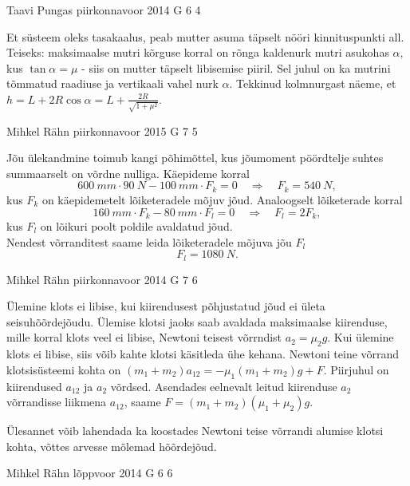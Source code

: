 \documentclass[11pt, twoside]{article}
\begin{document}
{%
{Taavi Pungas} %
{piirkonnavoor} %
{2014} %
{G 6} %
{4} %
{

\ifSolution
Et süsteem oleks tasakaalus, peab mutter asuma täpselt nööri kinnituspunkti all. Teiseks: maksimaalse mutri kõrguse korral on rõnga kaldenurk mutri asukohas $\alpha$, kus $\tan \alpha = \mu$ - siis on mutter täpselt libisemise piiril. Sel juhul on ka mutrini tõmmatud raadiuse ja vertikaali vahel nurk $\alpha$. Tekkinud kolmnurgast näeme, et $h=L+2R\cos \alpha = L+ \frac{2R}{\sqrt{1+\mu^2}}$.
\fi
}

{Mihkel Rähn} %
{piirkonnavoor} %
{2015} %
{G 7} %
{5} %
{

\ifSolution
Jõu ülekandmine toimub kangi põhimõttel, kus jõumoment pöördtelje suhtes summaarselt on võrdne nulliga. Käepideme korral
\[ \SI{600}{mm}\cdot\SI{90}{N}-\SI{100}{mm}\cdot F_k = 0 \quad\Rightarrow\quad F_k = \SI{540}{N}, \]
kus $F_k$ on käepidemetelt lõiketeradele mõjuv jõud. Analoogselt lõiketerade korral
\[ \SI{160}{mm}\cdot F_k - \SI{80}{mm}\cdot F_l = 0 \quad\Rightarrow\quad F_l = 2F_k, \]
kus $F_l$ on lõikuri poolt poldile avaldatud jõud.\\
Nendest võrranditest saame leida lõiketeradele mõjuva jõu $F_l$
\[ F_l = \SI{1080}{N}.\]
\fi
}

{Mihkel Rähn} %
{piirkonnavoor} %
{2014} %
{G 7} %
{6} %
{

\ifSolution
Ülemine klots ei libise, kui kiirendusest põhjustatud jõud ei ületa seisuhõõrdejõudu. Ülemise klotsi jaoks saab avaldada maksimaalse kiirenduse, mille korral klots veel ei libise, Newtoni teisest võrrndist $a_2=\mu_2g$. Kui ülemine klots ei libise, siis võib kahte klotsi käsitleda ühe kehana. Newtoni teine võrrand klotsisüsteemi kohta on $(m_1+m_2)a_{12} = -\mu_1 (m_1+m_2)g+F$. Piirjuhul on kiirendused $a_{12}$ ja $a_2$ võrdsed. Asendades eelnevalt leitud kiirenduse $a_2$ võrrandisse liikmena $a_{12}$, saame $F=(m_1+m_2)(\mu_1+\mu_2)g$.

Ülesannet võib lahendada ka koostades Newtoni teise võrrandi alumise klotsi kohta, võttes arvesse mõlemad hõõrdejõud. 
\fi
}

{Mihkel Rähn} %
{lõppvoor} %
{2014} %
{G 6} %
{6} %
{

}}
\end{document}
